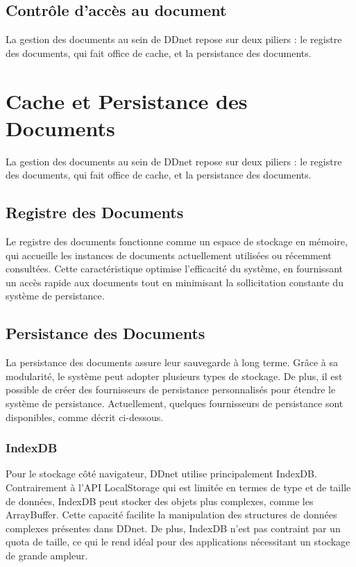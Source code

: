\subsection{Contrôle d'accès au document}

La gestion des documents au sein de DDnet repose sur deux piliers : le registre des documents, qui fait office de cache, et la persistance des documents.

\section{Cache et Persistance des Documents}

La gestion des documents au sein de DDnet repose sur deux piliers : le registre des documents, qui fait office de cache, et la persistance des documents.

\subsection{Registre des Documents}

Le registre des documents fonctionne comme un espace de stockage en mémoire, qui accueille les instances de documents actuellement utilisées ou récemment consultées. Cette caractéristique optimise l'efficacité du système, en fournissant un accès rapide aux documents tout en minimisant la sollicitation constante du système de persistance.

\subsection{Persistance des Documents}

La persistance des documents assure leur sauvegarde à long terme. Grâce à sa modularité, le système peut adopter plusieurs types de stockage. De plus, il est possible de créer des fournisseurs de persistance personnalisés pour étendre le système de persistance. Actuellement, quelques fournisseurs de persistance sont disponibles, comme décrit ci-dessous.

\subsubsection{IndexDB}

Pour le stockage côté navigateur, DDnet utilise principalement IndexDB. Contrairement à l'API LocalStorage qui est limitée en termes de type et de taille de données, IndexDB peut stocker des objets plus complexes, comme les ArrayBuffer. Cette capacité facilite la manipulation des structures de données complexes présentes dans DDnet. De plus, IndexDB n'est pas contraint par un quota de taille, ce qui le rend idéal pour des applications nécessitant un stockage de grande ampleur.


